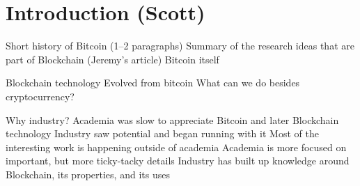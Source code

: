
\section{Introduction (Scott)}
Short history of Bitcoin (1--2 paragraphs)
	Summary of the research ideas that are part of Blockchain (Jeremy's article)
	Bitcoin itself
	
Blockchain technology
	Evolved from bitcoin
	What can we do besides cryptocurrency?
	
Why industry?
	Academia was slow to appreciate Bitcoin and later Blockchain technology
	Industry saw potential and began running with it
	Most of the interesting work is happening outside of academia
		Academia is more focused on important, but more ticky-tacky details
		Industry has built up knowledge around Blockchain, its properties, and its uses